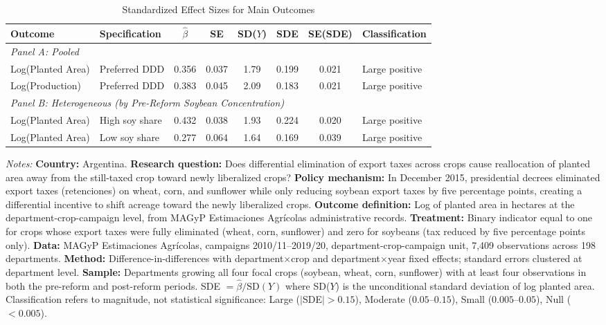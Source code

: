 \begin{table}[H]
\centering
\caption{Standardized Effect Sizes for Main Outcomes}
\label{tab:sde}
\begin{threeparttable}
\begin{adjustbox}{max width=\textwidth}
\begin{tabular}{llcccccl}
\toprule
Outcome & Specification & $\hat{\beta}$ & SE & SD($Y$) & SDE & SE(SDE) & Classification \\
\midrule
\multicolumn{8}{l}{\textit{Panel A: Pooled}} \\
Log(Planted Area) & Preferred DDD & 0.356 & 0.037 & 1.79 & 0.199 & 0.021 & Large positive \\
Log(Production) & Preferred DDD & 0.383 & 0.045 & 2.09 & 0.183 & 0.021 & Large positive \\
\midrule
\multicolumn{8}{l}{\textit{Panel B: Heterogeneous (by Pre-Reform Soybean Concentration)}} \\
Log(Planted Area) & High soy share & 0.432 & 0.038 & 1.93 & 0.224 & 0.020 & Large positive \\
Log(Planted Area) & Low soy share & 0.277 & 0.064 & 1.64 & 0.169 & 0.039 & Large positive \\
\bottomrule
\end{tabular}
\end{adjustbox}
\end{threeparttable}
\par\vspace{0.3em}
{\footnotesize \textit{Notes:} \textbf{Country:} Argentina. \textbf{Research question:} Does differential elimination of export taxes across crops cause reallocation of planted area away from the still-taxed crop toward newly liberalized crops? \textbf{Policy mechanism:} In December 2015, presidential decrees eliminated export taxes (retenciones) on wheat, corn, and sunflower while only reducing soybean export taxes by five percentage points, creating a differential incentive to shift acreage toward the newly liberalized crops. \textbf{Outcome definition:} Log of planted area in hectares at the department-crop-campaign level, from MAGyP Estimaciones Agr\'{i}colas administrative records. \textbf{Treatment:} Binary indicator equal to one for crops whose export taxes were fully eliminated (wheat, corn, sunflower) and zero for soybeans (tax reduced by five percentage points only). \textbf{Data:} MAGyP Estimaciones Agr\'{i}colas, campaigns 2010/11--2019/20, department-crop-campaign unit, 7,409 observations across 198 departments. \textbf{Method:} Difference-in-differences with department$\times$crop and department$\times$year fixed effects; standard errors clustered at department level. \textbf{Sample:} Departments growing all four focal crops (soybean, wheat, corn, sunflower) with at least four observations in both the pre-reform and post-reform periods. SDE $= \hat{\beta} / \text{SD}(Y)$ where SD($Y$) is the unconditional standard deviation of log planted area. Classification refers to magnitude, not statistical significance: Large ($|$SDE$| > 0.15$), Moderate ($0.05$--$0.15$), Small ($0.005$--$0.05$), Null ($< 0.005$).}
\end{table}

